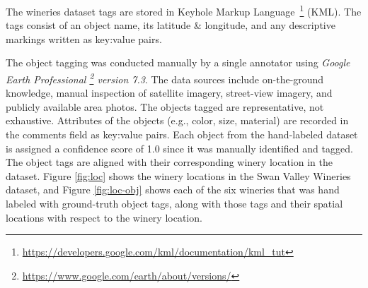 The wineries dataset tags are stored in Keyhole Markup Language~\footnote{\href{https://developers.google.com/kml/documentation/kml\_tut}{https://developers.google.com/kml/documentation/kml\_tut}} (KML).
The tags consist of an object name, its latitude \& longitude, and any descriptive markings written as key:value pairs. 

The object tagging was conducted manually by a single annotator using \textit{Google Earth Professional \footnote{\href{https://www.google.com/earth/about/versions/}{https://www.google.com/earth/about/versions/}} version 7.3}. 
The data sources include on-the-ground knowledge, manual inspection of satellite imagery, street-view imagery, and publicly available area photos. 
The objects tagged are representative, not exhaustive. 
Attributes of the objects (e.g., color, size, material) are recorded in the comments field as key:value pairs.
Each object from the hand-labeled dataset is assigned a confidence score of 1.0 since it was manually identified and tagged.
The object tags are aligned with their corresponding winery location in the dataset.
Figure \ref{fig:loc} shows the winery locations in the Swan Valley Wineries dataset, and Figure \ref{fig:loc-obj} shows each of the six wineries that was hand labeled with ground-truth object tags, along with those tags and their spatial locations with respect to the winery location.


\begin{figure*}[ht]
    
    \centering
    \caption[width=\textwidth]{A representative view of the six wineries in the dataset shows the geospatial heterogeneity of object positions between locations.}
    \label{fig:loc-obj}  
\end{figure*}


